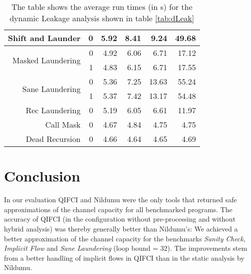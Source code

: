 \begin{table}[]
\begin{tabular}{rr|rr|rr}
Shift and Launder                  & 0       & 5.92             & 8.41            & 9.24              & 49.68             \\\hline
\multirow{2}{*}{Masked Laundering} & 0       & 4.92             & 6.06            & 6.71              & 17.12             \\
                                   & 1       & 4.83             & 6.15            & 6.71              & 17.55             \\\hline
\multirow{2}{*}{Sane Laundering}   & 0       & 5.36             & 7.25            & 13.63             & 55.24             \\
                                   & 1       & 5.37             & 7.42            & 13.17             & 54.48             \\\hline\hline
Rec Laundering                     & 0       & 5.19             & 6.05            & 6.61              & 11.97             \\\hline
Call Mask                          & 0       & 4.67             & 4.84            & 4.75              & 4.75              \\\hline
Dead Recursion                     & 0       & 4.66             & 4.64            & 4.65              & 4.69
\end{tabular}
\caption{The table shows the average run times (in s) for the dynamic Leakage analysis shown in table \ref{tab:dLeak}}\label{tab:dLeakTime}
\end{table}

\section{Conclusion}
In our evaluation QIFCI and Nildumu were the only tools that returned safe approximations of the channel capacity for all benchmarked programs.
The accuracy of QIFCI (in the configuration without pre-processing and without hybrid analysis) was thereby generally better than Nildumu's: We achieved a better approximation of the channel capacity for the benchmarks \emph{Sanity Check}, \emph{Implicit Flow} and \emph{Sane Laundering} (loop bound = 32). The improvements stem from a better handling of implicit flows in QIFCI than in the static analysis by Nildumu.
